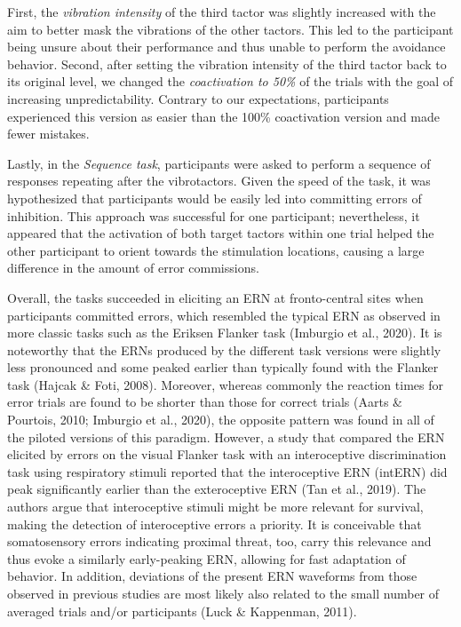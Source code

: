 \documentclass[twocolumn, serif, authordate, review]{jote-article}
\begin{document}
First, the \textit{vibration intensity} of the third tactor was slightly increased with the aim to better mask the vibrations of the other tactors. This led to the participant being unsure about their performance and thus unable to perform the avoidance behavior. Second, after setting the vibration intensity of the third tactor back to its original level, we changed the \textit{coactivation to 50\%} of the trials with the goal of increasing unpredictability. Contrary to our expectations, participants experienced this version as easier than the 100\% coactivation version and made fewer mistakes.

Lastly, in the \textit{Sequence task}, participants were asked to perform a sequence of responses repeating after the vibrotactors. Given the speed of the task, it was hypothesized that participants would be easily led into committing errors of inhibition. This approach was successful for one participant; nevertheless, it appeared that the activation of both target tactors within one trial helped the other participant to orient towards the stimulation locations, causing a large difference in the amount of error commissions.~

Overall, the tasks succeeded in eliciting an ERN at fronto-central sites when participants committed errors, which resembled the typical ERN as observed in more classic tasks such as the Eriksen Flanker task (Imburgio et al., 2020). It is noteworthy that the ERNs produced by the different task versions were slightly less pronounced and some peaked earlier than typically found with the Flanker task (Hajcak \& Foti, 2008). Moreover, whereas commonly the reaction times for error trials are found to be shorter than those for correct trials (Aarts \& Pourtois, 2010; Imburgio et al., 2020), the opposite pattern was found in all of the piloted versions of this paradigm. However, a study that compared the ERN elicited by errors on the visual Flanker task with an interoceptive discrimination task using respiratory stimuli reported that the interoceptive ERN (intERN) did peak significantly earlier than the exteroceptive ERN (Tan et al., 2019). The authors argue that interoceptive stimuli might be more relevant for survival, making the detection of interoceptive errors a priority. It is conceivable that somatosensory errors indicating proximal threat, too, carry this relevance and thus evoke a similarly early-peaking ERN, allowing for fast adaptation of behavior. In addition, deviations of the present ERN waveforms from those observed in previous studies are most likely also related to the small number of averaged trials and/or participants (Luck \& Kappenman, 2011).
\end{document}
